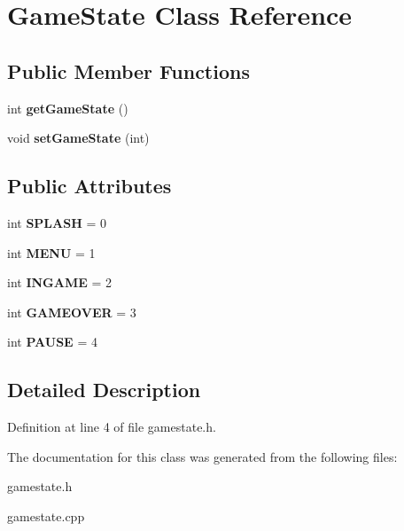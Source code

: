 \hypertarget{classGameState}{}\section{Game\+State Class Reference}
\label{classGameState}
\subsection*{Public Member Functions}
\begin{DoxyCompactItemize}
\item 
\mbox{\label{classGameState_af20f310030244f07204b2e53b364332e}} 
int {\bfseries get\+Game\+State} ()
\item 
\mbox{\label{classGameState_abb0ab40349a3094465a74643eb731e22}} 
void {\bfseries set\+Game\+State} (int)
\end{DoxyCompactItemize}
\subsection*{Public Attributes}
\begin{DoxyCompactItemize}
\item 
\mbox{\label{classGameState_ade9e04b33f1dea1d62358a4f63b9a509}} 
int {\bfseries S\+P\+L\+A\+SH} = 0
\item 
\mbox{\label{classGameState_abd9f3d7cdc22931db952cc17010752a1}} 
int {\bfseries M\+E\+NU} = 1
\item 
\mbox{\label{classGameState_aae6641ae96366549f729c136cdcc5c5c}} 
int {\bfseries I\+N\+G\+A\+ME} = 2
\item 
\mbox{\label{classGameState_a994c426ab97d2c6e186c13fd357ccc68}} 
int {\bfseries G\+A\+M\+E\+O\+V\+ER} = 3
\item 
\mbox{\label{classGameState_a1353d084bf0c63bd879656de599db4b5}} 
int {\bfseries P\+A\+U\+SE} = 4
\end{DoxyCompactItemize}


\subsection{Detailed Description}


Definition at line 4 of file gamestate.\+h.



The documentation for this class was generated from the following files\+:\begin{DoxyCompactItemize}
\item 
gamestate.\+h\item 
gamestate.\+cpp\end{DoxyCompactItemize}
